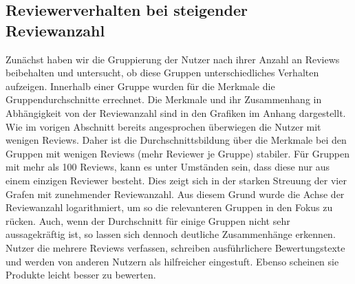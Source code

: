 \documentclass{scrartcl}
\theoremstyle{my_th_style}
\begin{document}
\subsection{Reviewerverhalten bei steigender Reviewanzahl}
Zunächst haben wir die Gruppierung der Nutzer nach ihrer Anzahl an Reviews beibehalten und untersucht, ob diese Gruppen unterschiedliches Verhalten aufzeigen. Innerhalb einer Gruppe wurden für die Merkmale die Gruppendurchschnitte errechnet. Die Merkmale und ihr Zusammenhang in Abhängigkeit von der Reviewanzahl sind in den Grafiken im Anhang dargestellt.\\
Wie im vorigen Abschnitt bereits angesprochen überwiegen die Nutzer mit wenigen Reviews. Daher ist die Durchschnittsbildung über die Merkmale bei den Gruppen mit wenigen Reviews (mehr Reviewer je Gruppe) stabiler. Für Gruppen mit mehr als 100 Reviews, kann es unter Umständen sein, dass diese nur aus einem einzigen Reviewer besteht. Dies zeigt sich in der starken Streuung der vier Grafen mit zunehmender Reviewanzahl. Aus diesem Grund wurde die Achse der Reviewanzahl logarithmiert, um so die relevanteren Gruppen in den Fokus zu rücken. Auch, wenn der Durchschnitt für einige Gruppen nicht sehr aussagekräftig ist, so lassen sich dennoch deutliche Zusammenhänge erkennen. Nutzer die mehrere Reviews verfassen, schreiben ausführlichere Bewertungstexte und werden von anderen Nutzern als hilfreicher eingestuft. Ebenso scheinen sie Produkte leicht besser zu bewerten.
\end{document}
